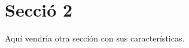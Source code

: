 \documentclass{article}
\begin{document}
\section{Secció 2} \label{section:Clustering}

Aquí vendría otra sección con sus características.
\end{document}
